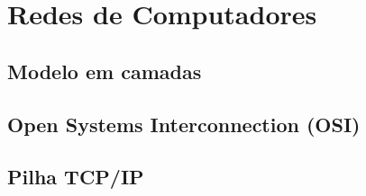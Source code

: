 \section{Redes de Computadores}

    \subsection{Modelo em camadas}
        \subsection{Open Systems Interconnection (OSI)}
        \subsection{Pilha TCP/IP}
